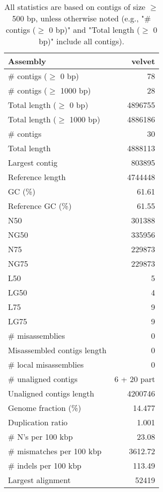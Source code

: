 \documentclass[12pt,a4paper]{article}
\begin{document}
\begin{table}[ht]
\begin{center}
\caption{All statistics are based on contigs of size $\geq$ 500 bp, unless otherwise noted (e.g., "\# contigs ($\geq$ 0 bp)" and "Total length ($\geq$ 0 bp)" include all contigs).}
\begin{tabular}{|l*{1}{|r}|}
\hline
Assembly & velvet \\ \hline
\# contigs ($\geq$ 0 bp) & 78 \\ \hline
\# contigs ($\geq$ 1000 bp) & 28 \\ \hline
Total length ($\geq$ 0 bp) & 4896755 \\ \hline
Total length ($\geq$ 1000 bp) & 4886186 \\ \hline
\# contigs & 30 \\ \hline
Total length & 4888113 \\ \hline
Largest contig & 803895 \\ \hline
Reference length & 4744448 \\ \hline
GC (\%) & 61.61 \\ \hline
Reference GC (\%) & 61.55 \\ \hline
N50 & 301388 \\ \hline
NG50 & 335956 \\ \hline
N75 & 229873 \\ \hline
NG75 & 229873 \\ \hline
L50 & 5 \\ \hline
LG50 & 4 \\ \hline
L75 & 9 \\ \hline
LG75 & 9 \\ \hline
\# misassemblies & 0 \\ \hline
Misassembled contigs length & 0 \\ \hline
\# local misassemblies & 0 \\ \hline
\# unaligned contigs & 6 + 20 part \\ \hline
Unaligned contigs length & 4200746 \\ \hline
Genome fraction (\%) & 14.477 \\ \hline
Duplication ratio & 1.001 \\ \hline
\# N's per 100 kbp & 23.08 \\ \hline
\# mismatches per 100 kbp & 3612.72 \\ \hline
\# indels per 100 kbp & 113.49 \\ \hline
Largest alignment & 52419 \\ \hline
\end{tabular}
\end{center}
\end{table}
\end{document}
